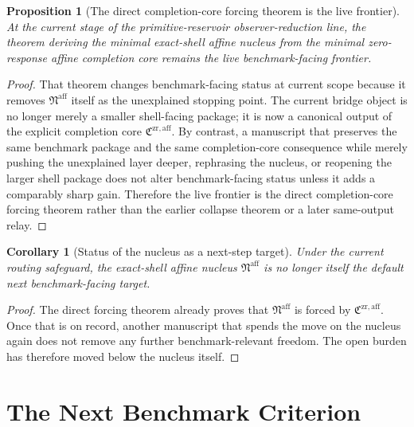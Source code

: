 \documentclass[11pt]{article}
\newcommand{\CompletionCore}{\mathfrak C^{\mathrm{zr,aff}}}
\newcommand{\AffineNucleus}{\mathfrak N^{\mathrm{aff}}}
\newtheorem{proposition}{Proposition}
\newtheorem{corollary}{Corollary}
\begin{document}
\begin{proposition}[The direct completion-core forcing theorem is the live frontier]
At the current stage of the primitive-reservoir observer-reduction line, the theorem deriving the minimal exact-shell affine nucleus from the minimal zero-response affine completion core remains the live benchmark-facing frontier.
\end{proposition}

\begin{proof}
That theorem changes benchmark-facing status at current scope because it removes \(\AffineNucleus\) itself as the unexplained stopping point. The current bridge object is no longer merely a smaller shell-facing package; it is now a canonical output of the explicit completion core \(\CompletionCore\). By contrast, a manuscript that preserves the same benchmark package and the same completion-core consequence while merely pushing the unexplained layer deeper, rephrasing the nucleus, or reopening the larger shell package does not alter benchmark-facing status unless it adds a comparably sharp gain. Therefore the live frontier is the direct completion-core forcing theorem rather than the earlier collapse theorem or a later same-output relay.
\end{proof}

\begin{corollary}[Status of the nucleus as a next-step target]
Under the current routing safeguard, the exact-shell affine nucleus \(\AffineNucleus\) is no longer itself the default next benchmark-facing target.
\end{corollary}

\begin{proof}
The direct forcing theorem already proves that \(\AffineNucleus\) is forced by \(\CompletionCore\). Once that is on record, another manuscript that spends the move on the nucleus again does not remove any further benchmark-relevant freedom. The open burden has therefore moved below the nucleus itself.
\end{proof}

\section{The Next Benchmark Criterion}
\end{document}
